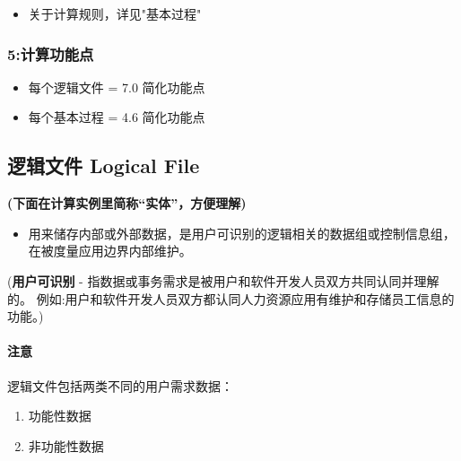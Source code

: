 \begin{itemize}
\tightlist
\item
  关于计算规则，详见"基本过程"
\end{itemize}

\hypertarget{ux8ba1ux7b97ux529fux80fdux70b9}{%
\subsubsection{5:计算功能点}\label{ux8ba1ux7b97ux529fux80fdux70b9}}

\begin{itemize}
\tightlist
\item
  每个逻辑文件 = 7.0 简化功能点
\item
  每个基本过程 = 4.6 简化功能点
\end{itemize}

\hypertarget{ux903bux8f91ux6587ux4ef6-logical-file}{%
\subsection{逻辑文件 Logical
File}\label{ux903bux8f91ux6587ux4ef6-logical-file}}

\textbf{(下面在计算实例里简称``实体''，方便理解)}

\begin{itemize}
\tightlist
\item
  用来储存内部或外部数据，是用户可识别的逻辑相关的数据组或控制信息组，在被度量应用边界内部维护。
\end{itemize}

\begin{description}
\tightlist
\item[]
(\textbf{用户可识别} -
指数据或事务需求是被用户和软件开发人员双方共同认同并理解的。
例如:用户和软件开发人员双方都认同人力资源应用有维护和存储员工信息的功能。)
\end{description}

\hypertarget{ux6ce8ux610f}{%
\paragraph{注意}\label{ux6ce8ux610f}}

逻辑文件包括两类不同的用户需求数据：

\begin{enumerate}
\tightlist
\item
  功能性数据
\item
  非功能性数据
\end{enumerate}

